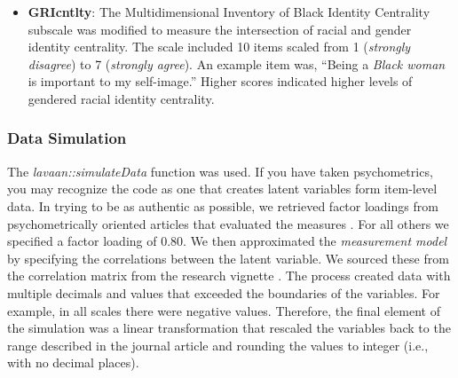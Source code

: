 \documentclass[
  11pt,
]{book}
\begin{document}
\begin{itemize}
\item
  \textbf{GRIcntlty}: The Multidimensional Inventory of Black Identity Centrality subscale \citep{sellers_multidimensional_nodate} was modified to measure the intersection of racial and gender identity centrality. The scale included 10 items scaled from 1 (\emph{strongly disagree}) to 7 (\emph{strongly agree}). An example item was, ``Being a \emph{Black woman} is important to my self-image.'' Higher scores indicated higher levels of gendered racial identity centrality.
\end{itemize}

\hypertarget{data-simulation-2}{%
\subsubsection{Data Simulation}\label{data-simulation-2}}

The \emph{lavaan::simulateData} function was used. If you have taken psychometrics, you may recognize the code as one that creates latent variables form item-level data. In trying to be as authentic as possible, we retrieved factor loadings from psychometrically oriented articles that evaluated the measures \citep{nadal_racial_2011, veit_structure_1983}. For all others we specified a factor loading of 0.80. We then approximated the \emph{measurement model} by specifying the correlations between the latent variable. We sourced these from the correlation matrix from the research vignette \citep{lewis_applying_2017}. The process created data with multiple decimals and values that exceeded the boundaries of the variables. For example, in all scales there were negative values. Therefore, the final element of the simulation was a linear transformation that rescaled the variables back to the range described in the journal article and rounding the values to integer (i.e., with no decimal places).
\end{document}
